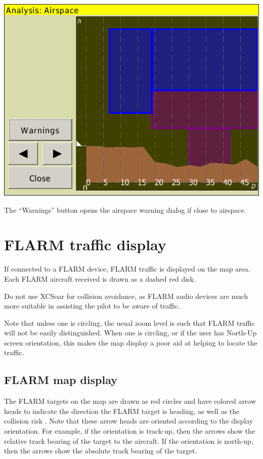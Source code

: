 \documentclass[a4paper,12pt]{refrep}
\begin{document}
\begin{center}
\includegraphics[angle=0,width=\linewidth,keepaspectratio='true']{figures/analysis-airspace.png}
\end{center}

The ``Warnings'' button opens the airspace warning dialog if close to
airspace.

\section{FLARM traffic display}

If connected to a FLARM device, FLARM traffic is displayed on the map
area.  Each FLARM aircraft received is drawn as a dashed red disk.

\warning Do not use XCSoar for collision avoidance, as
FLARM audio devices are much more suitable in assisting the pilot to be
aware of traffic.

Note that unless one is circling, the usual zoom level is such that
FLARM traffic will not be easily distinguished.  When one is circling,
or if the user has North-Up screen orientation, this makes the map display 
a poor aid at helping to locate the traffic.

\subsection*{FLARM map display}

The FLARM targets on the map are drawn as red circles and have colored 
arrow heads to indicate the direction the FLARM target is
heading, as well as the collision risk .  Note that these
arrow heads are oriented according to the display orientation.  For example, if 
the orientation is track-up, then the arrows show the relative track bearing of
the target to the aircraft.  If the orientation is north-up, then the arrows show the
absolute track bearing of the target.
\end{document}
